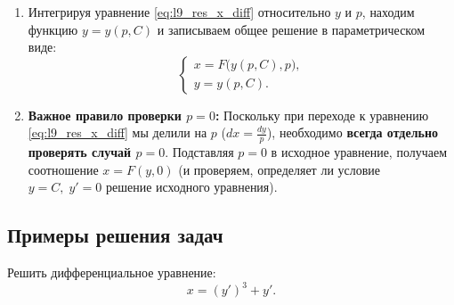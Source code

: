 \begin{enumerate}
    \item Интегрируя уравнение \eqref{eq:l9_res_x_diff} относительно $y$ и $p$,
    находим функцию $y = y(p, C)$ и записываем общее решение в параметрическом
    виде:
    \begin{equation} \label{eq:l9_res_x_ans}
        \begin{cases}
            x = F\bigl(y(p, C), p\bigr), \\
            y = y(p, C).
        \end{cases} \tag{12}
    \end{equation}
    \item \textbf{Важное правило проверки $p = 0$:} Поскольку при переходе к
    уравнению \eqref{eq:l9_res_x_diff} мы делили на $p$ ($dx = \frac{dy}{p}$),
    необходимо \textbf{всегда отдельно проверять случай $p = 0$}. Подставляя
    $p = 0$ в исходное уравнение, получаем соотношение $x = F(y, 0)$ (и
    проверяем, определяет ли условие $y = C, \; y' = 0$ решение исходного
    уравнения).
\end{enumerate}

\subsection{Примеры решения задач}

\begin{problem}[Ф.267]
    Решить дифференциальное уравнение:
    \begin{equation} \label{eq:l9_f267}
        x = (y')^3 + y'. \tag{13}
    \end{equation}
\end{problem}

